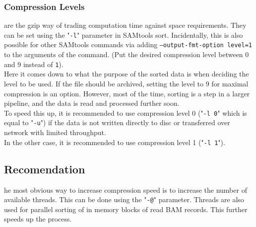 \subsubsection{Compression Levels} are  the gzip way of trading computation time against space requirements. They can be set using the "\texttt{-l}" parameter in SAMtools sort. Incidentally, this is also possible for other SAMtools commands via adding \texttt{--output-fmt-option level=1} to the arguments of the command. (Put the desired compression level between 0 and 9 instead of \texttt{1}). \\
Here it comes down to what the purpose of the sorted data is when deciding the level to be used. If the file should be archived, setting the level to 9 for maximal compression is an option. However, most of the time, sorting is a step in a larger pipeline, and the data is read and processed further soon. \\
To speed this up, it is recommended to use compression level 0 ("\texttt{-l 0}" which is equal to "\texttt{-u}") if the data is not written directly to  disc or transferred over network with limited throughput. \\
In the other case, it is recommended to use compression level 1 ("\texttt{-l 1}").

\subsection{Recomendation}
he most obvious way to increase compression speed is to increase the number of available threads. This can be done using the "\texttt{-@}" parameter. Threads are also used for parallel sorting of in memory blocks of read BAM records. This further speeds up the process.

